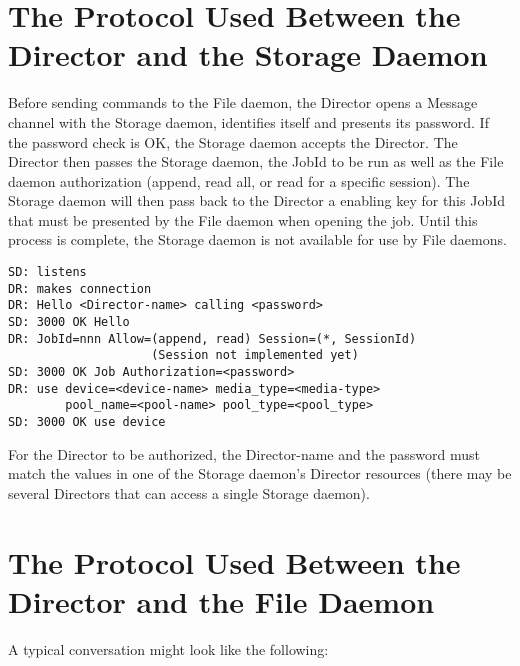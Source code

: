 \section{The Protocol Used Between the Director and the Storage Daemon}

Before sending commands to the File daemon, the Director opens a Message
channel with the Storage daemon, identifies itself and presents its password.
If the password check is OK, the Storage daemon accepts the Director. The
Director then passes the Storage daemon, the JobId to be run as well as the
File daemon authorization (append, read all, or read for a specific session).
The Storage daemon will then pass back to the Director a enabling key for this
JobId that must be presented by the File daemon when opening the job. Until
this process is complete, the Storage daemon is not available for use by File
daemons. 

\footnotesize
\begin{verbatim}
SD: listens
DR: makes connection
DR: Hello <Director-name> calling <password>
SD: 3000 OK Hello
DR: JobId=nnn Allow=(append, read) Session=(*, SessionId)
                    (Session not implemented yet)
SD: 3000 OK Job Authorization=<password>
DR: use device=<device-name> media_type=<media-type>
        pool_name=<pool-name> pool_type=<pool_type>
SD: 3000 OK use device
\end{verbatim}
\normalsize

For the Director to be authorized, the \lt{}Director-name\gt{} and the
\lt{}password\gt{} must match the values in one of the Storage daemon's
Director resources (there may be several Directors that can access a single
Storage daemon). 

\section{The Protocol Used Between the Director and the File Daemon}

A typical conversation might look like the following: 

